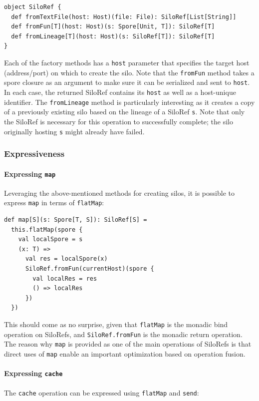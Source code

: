 \documentclass[preprint]{sigplanconf}
\theoremstyle{definition}
\theoremstyle{definition}
\begin{document}
\begin{lstlisting}
object SiloRef {
  def fromTextFile(host: Host)(file: File): SiloRef[List[String]]
  def fromFun[T](host: Host)(s: Spore[Unit, T]): SiloRef[T]
  def fromLineage[T](host: Host)(s: SiloRef[T]): SiloRef[T]
}
\end{lstlisting}
\noindent
Each of the factory methods has a \verb|host| parameter that specifies the
target host (address/port) on which to create the silo. Note that the
\verb|fromFun| method takes a spore closure as an argument to make sure it can
be serialized and sent to \verb|host|. In each case, the returned SiloRef
contains its \verb|host| as well as a host-unique identifier. The
\verb|fromLineage| method is particularly interesting as it creates a copy of
a previously existing silo based on the lineage of a SiloRef \verb|s|. Note
that only the SiloRef is necessary for this operation to successfully
complete; the silo originally hosting \verb|s| might already have failed.

\subsubsection{Expressiveness}
\label{sec:expr}

\paragraph{Expressing \texttt{map}} Leveraging the above-mentioned methods for
creating silos, it is possible to express \verb|map| in terms of
\verb|flatMap|:

\begin{lstlisting}
def map[S](s: Spore[T, S]): SiloRef[S] =
  this.flatMap(spore {
    val localSpore = s
    (x: T) =>
      val res = localSpore(x)
      SiloRef.fromFun(currentHost)(spore {
        val localRes = res
        () => localRes
      })
  })
\end{lstlisting}
\noindent
This should come as no surprise, given that \verb|flatMap| is the monadic bind
operation on SiloRefs, and \verb|SiloRef.fromFun| is the monadic return
operation. The reason why \verb|map| is provided as one of the main operations
of SiloRefs is that direct uses of \verb|map| enable an important optimization
based on operation fusion.

\paragraph{Expressing \texttt{cache}} The \verb|cache| operation can be
expressed using \verb|flatMap| and \verb|send|:
\end{document}
